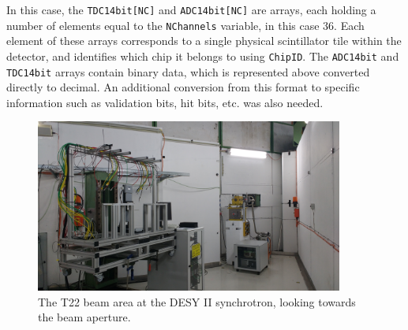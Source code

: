 %
%

In this case, the \texttt{TDC14bit[NC]} and \texttt{ADC14bit[NC]} are arrays, each holding a number of elements equal to the \texttt{NChannels} variable, in this case 36. Each element of these arrays corresponds to a single physical scintillator tile within the detector, and identifies which chip it belongs to using \texttt{ChipID}. The \texttt{ADC14bit} and \texttt{TDC14bit} arrays contain binary data, which is represented above converted directly to decimal. An additional conversion from this format to specific information such as validation bits, hit bits, etc. was also needed.


\begin{figure}[p]
	\centering
	\includegraphics[width=0.9\textwidth]{../Pictures/AHCAL-DESY-2016-Beam.jpg}
	\caption{The T22 beam area at the DESY II synchrotron, looking towards the beam aperture.}
	\label{figure:aida/may2016/beamarea}
\end{figure}

